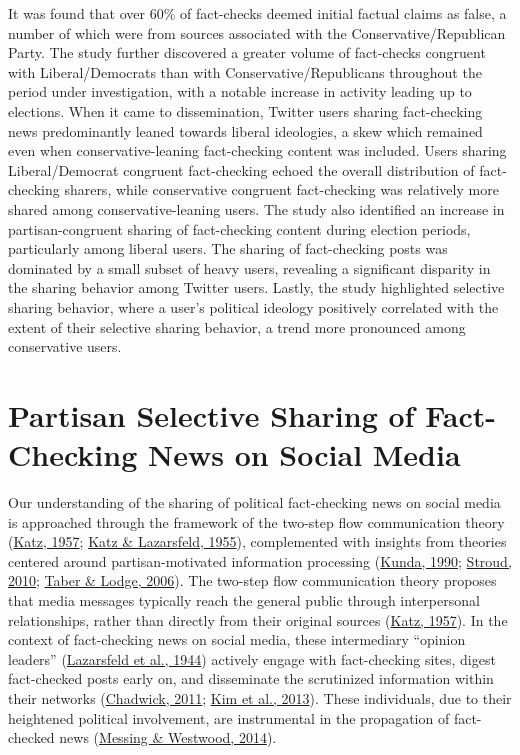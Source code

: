 \documentclass[
  12pt,
]{article}
\begin{document}
It was found that over 60\% of fact-checks deemed initial factual claims
as false, a number of which were from sources associated with the
Conservative/Republican Party. The study further discovered a greater
volume of fact-checks congruent with Liberal/Democrats than with
Conservative/Republicans throughout the period under investigation, with
a notable increase in activity leading up to elections. When it came to
dissemination, Twitter users sharing fact-checking news predominantly
leaned towards liberal ideologies, a skew which remained even when
conservative-leaning fact-checking content was included. Users sharing
Liberal/Democrat congruent fact-checking echoed the overall distribution
of fact-checking sharers, while conservative congruent fact-checking was
relatively more shared among conservative-leaning users. The study also
identified an increase in partisan-congruent sharing of fact-checking
content during election periods, particularly among liberal users. The
sharing of fact-checking posts was dominated by a small subset of heavy
users, revealing a significant disparity in the sharing behavior among
Twitter users. Lastly, the study highlighted selective sharing behavior,
where a user's political ideology positively correlated with the extent
of their selective sharing behavior, a trend more pronounced among
conservative users.

\hypertarget{partisan-selective-sharing-of-fact-checking-news-on-social-media}{%
\section{Partisan Selective Sharing of Fact-Checking News on Social
Media}\label{partisan-selective-sharing-of-fact-checking-news-on-social-media}}

Our understanding of the sharing of political fact-checking news on
social media is approached through the framework of the two-step flow
communication theory (\protect\hyperlink{ref-katz1957two}{Katz, 1957};
\protect\hyperlink{ref-katz1955personal}{Katz \& Lazarsfeld, 1955}),
complemented with insights from theories centered around
partisan-motivated information processing
(\protect\hyperlink{ref-kunda1990case}{Kunda, 1990};
\protect\hyperlink{ref-stroud2010polarization}{Stroud, 2010};
\protect\hyperlink{ref-taber2006motivated}{Taber \& Lodge, 2006}). The
two-step flow communication theory proposes that media messages
typically reach the general public through interpersonal relationships,
rather than directly from their original sources
(\protect\hyperlink{ref-katz1957two}{Katz, 1957}). In the context of
fact-checking news on social media, these intermediary ``opinion
leaders'' (\protect\hyperlink{ref-lazarsfeld1944people}{Lazarsfeld et
al., 1944}) actively engage with fact-checking sites, digest
fact-checked posts early on, and disseminate the scrutinized information
within their networks
(\protect\hyperlink{ref-chadwick2011political}{Chadwick, 2011};
\protect\hyperlink{ref-kim2013stumbling}{Kim et al., 2013}). These
individuals, due to their heightened political involvement, are
instrumental in the propagation of fact-checked news
(\protect\hyperlink{ref-messing2014selective}{Messing \& Westwood,
2014}).
\end{document}

